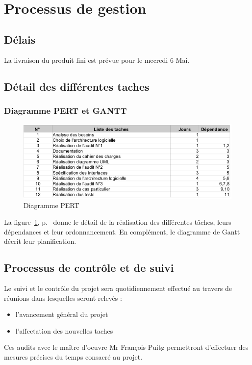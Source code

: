 
\section{Processus de gestion}
\subsection{Délais}
La livraison du produit fini est prévue pour le mecredi 6 Mai.

\subsection{Détail des différentes taches}
\subsubsection{Diagramme PERT et GANTT}
\begin{figure}[thbp]
	\centering
		\includegraphics[width=15cm]{../diagrammes/pert.png}
	\caption{Diagramme PERT}
	\label{fig:pert}
\end{figure}
La figure~\ref{fig:pert}, p.~\pageref{fig:pert} donne le détail de la réalisation des différentes tâches, leurs dépendances et leur ordonnancement. En complément, le diagramme de Gantt décrit leur planification.

\subsection{Processus de contrôle et de suivi}

Le suivi et le contrôle du projet sera quotidiennement effectué au travers de réunions dans lesquelles seront relevés : 
\begin{itemize}
 \item l'avancement général du projet
 \item l'affectation des nouvelles taches
\end{itemize}

Ces audits avec le maître d’oeuvre Mr François Puitg permettront d'effectuer des mesures précises du temps consacré au projet.


